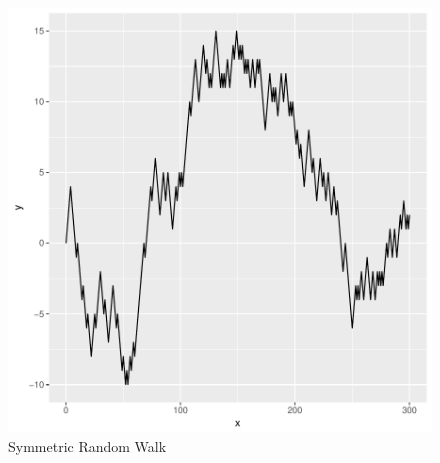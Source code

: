 \documentclass{article}
\begin{document}
\begin{figure}[!h]
\begin{center}


\includegraphics{SymmetricRandomWalk-003}


\end{center}
\caption{Symmetric Random Walk}
\end{figure}
\end{document}

